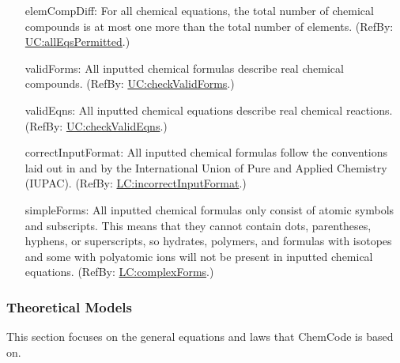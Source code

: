 \documentclass[12pt]{article}
\begin{document}
\begin{itemize}
\item[elemCompDiff:\phantomsection\label{elemCompDiff}]{For all chemical equations, the total number of chemical compounds is at most one more than the total number of elements. (RefBy: \hyperref[allEqsPermitted]{UC:allEqsPermitted}.)}
\item[validForms:\phantomsection\label{validForms}]{All inputted chemical formulas describe real chemical compounds. (RefBy: \hyperref[checkValidForms]{UC:checkValidForms}.)}
\item[validEqns:\phantomsection\label{validEqns}]{All inputted chemical equations describe real chemical reactions. (RefBy: \hyperref[checkValidEqns]{UC:checkValidEqns}.)}
\item[correctInputFormat:\phantomsection\label{correctInputFormat}]{All inputted chemical formulas follow the conventions laid out in \cite{inorganicIUPAC} and \cite{organicIUPAC} by the International Union of Pure and Applied Chemistry (IUPAC). (RefBy: \hyperref[incorrectInputFormat]{LC:incorrectInputFormat}.)}
\item[simpleForms:\phantomsection\label{simpleForms}]{All inputted chemical formulas only consist of atomic symbols and subscripts. This means that they cannot contain dots, parentheses, hyphens, or superscripts, so hydrates, polymers, and formulas with isotopes and some with polyatomic ions will not be present in inputted chemical equations. (RefBy: \hyperref[complexForms]{LC:complexForms}.)}
\end{itemize}
\subsubsection{Theoretical Models}
\label{Sec:TMs}
This section focuses on the general equations and laws that ChemCode is based on.
\end{document}
